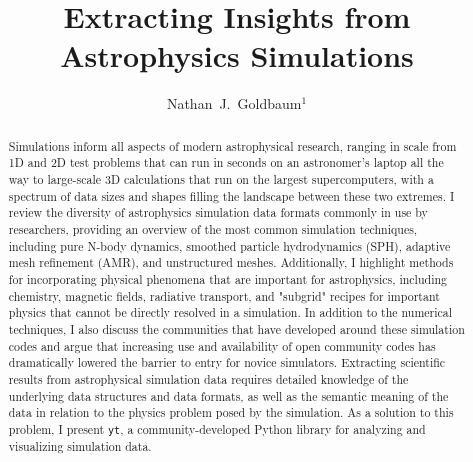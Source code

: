 \documentclass[11pt,twoside]{article}
\newcommand{\yt}{\texttt{yt}}
\begin{document}
\title{Extracting Insights from Astrophysics Simulations}

\author{Nathan~J.~Goldbaum$^1$}



\begin{abstract}
Simulations inform all aspects of modern astrophysical research, ranging in scale from 1D and 2D test problems that can run in seconds on an astronomer's laptop all the way to large-scale 3D calculations that run on the largest supercomputers, with a spectrum of data sizes and shapes filling the landscape between these two extremes. I review the diversity of astrophysics simulation data formats commonly in use by researchers, providing an overview of the most common simulation techniques, including pure N-body dynamics, smoothed particle hydrodynamics (SPH), adaptive mesh refinement (AMR), and unstructured meshes. Additionally, I highlight methods for incorporating physical phenomena that are important for astrophysics, including chemistry, magnetic fields, radiative transport, and "subgrid" recipes for important physics that cannot be directly resolved in a simulation. In addition to the numerical techniques, I also discuss the communities that have developed around these simulation codes and argue that increasing use and availability of open community codes has dramatically lowered the barrier to entry for novice simulators. Extracting scientific results from astrophysical simulation data requires detailed knowledge of the underlying data structures and data formats, as well as the semantic meaning of the data in relation to the physics problem posed by the simulation. As a solution to this problem, I present \yt, a community-developed Python library for analyzing and visualizing simulation data.
\end{abstract}
\end{document}
